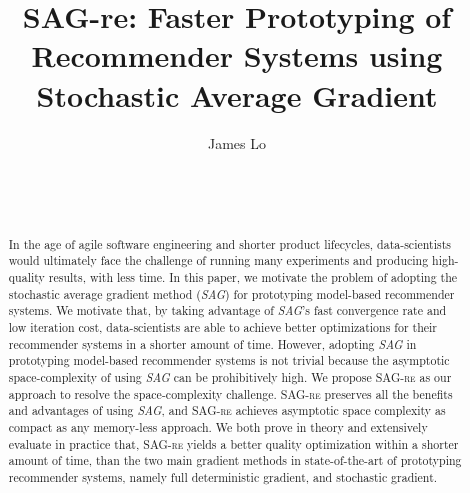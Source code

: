 \documentclass{sig-alternate}
\newcommand{\tool}{\textsc{SAG-re}\xspace}
\begin{document}


\title{{\ttlit SAG-re}: Faster Prototyping of Recommender Systems using Stochastic Average Gradient}
\author{
\alignauthor
James Lo\\	
       \\
       \\	   
       \\
}

\maketitle
\begin{abstract}
In the age of agile software engineering and shorter product lifecycles, data-scientists would ultimately face the challenge of running many experiments and producing high-quality results, with less time.
In this paper, we motivate the problem of adopting the stochastic average gradient method (\emph{SAG}) for prototyping model-based recommender systems.  
We motivate that, by taking advantage of \emph{SAG}'s fast convergence rate and low iteration cost, data-scientists are able to achieve better optimizations for their recommender systems in a shorter amount of time.
However, adopting \emph{SAG} in prototyping model-based recommender systems is not trivial because the asymptotic space-complexity of using \emph{SAG} can be prohibitively high.
We propose \tool as our approach to resolve the space-complexity challenge.
\tool preserves all the benefits and advantages of using \emph{SAG}, and \tool achieves asymptotic space complexity as compact as any memory-less approach.  
We both prove in theory and extensively evaluate in practice that, \tool yields a better quality optimization within a shorter amount of time, than the two main gradient methods in state-of-the-art of prototyping recommender systems, namely full deterministic gradient, and stochastic gradient.

\end{abstract}
\end{document}
